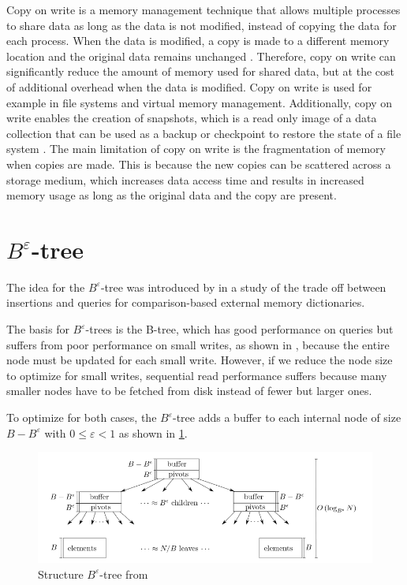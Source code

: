 \documentclass[
	12pt,
	a4paper,
	abstract,
	bibliography=totoc,
	chapterprefix,
	headings=openright,
	numbers=endperiod,
	parskip=half,
	twoside,
]{scrreprt}
\begin{document}
Copy on write is a memory management technique that allows multiple processes to 
share data as long as the data is not modified, instead of copying the data for each process. 
When the data is modified, a copy is made to a different memory location and 
the original data remains unchanged \cite{ha2022ccow}.
Therefore, copy on write can significantly reduce the amount of memory used for shared data, 
but at the cost of additional overhead when the data is modified.
Copy on write is used for example in file systems and virtual memory management.
Additionally, copy on write enables the creation of snapshots, which is a read only image of a 
data collection that can be used as a backup or checkpoint to restore the state of a file system \cite{peterson2002data}.
The main limitation of copy on write is the fragmentation of memory when copies are made.
This is because the new copies can be scattered across a storage medium, which increases data access time and 
results in increased memory usage as long as the original data and the copy are present.


\section{$B^{\varepsilon}$-tree}
\label{sec:tree}

The idea for the $B^{\varepsilon}$-tree was introduced by \cite{brodal2003lower} in a study of the trade off between 
insertions and queries for comparison-based external memory dictionaries.

The basis for $B^{\varepsilon}$-trees is the B-tree, which has good performance on queries but suffers 
from poor performance on small writes, as shown in \cite{bender2015introduction}, 
because the entire node must be updated for each small write.
However, if we reduce the node size to optimize for small writes, sequential read performance 
suffers because many smaller nodes have to be fetched from disk instead of fewer but larger ones.

To optimize for both cases, the $B^{\varepsilon}$-tree adds a buffer to each 
internal node of size $B - B^{\varepsilon} $ with $ 0 \leq \varepsilon < 1$ as shown 
in \cref{fig:structure B-epsilon-tree}.

\begin{figure}[ht]
	\centering
	\includegraphics[scale=0.6]{B-epsilon_structure.png}
	\caption{Structure $B^{\varepsilon}$-tree from \cite{bender2015introduction}}
		\label{fig:structure B-epsilon-tree}
\end{figure}
\end{document}

